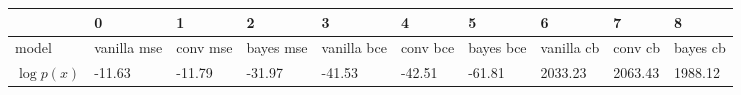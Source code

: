 \begin{tabular}{llllllllll}
\toprule
{} &            0 &         1 &          2 &            3 &         4 &          5 &           6 &        7 &         8 \\
\midrule
model       &  vanilla mse &  conv mse &  bayes mse &  vanilla bce &  conv bce &  bayes bce &  vanilla cb &  conv cb &  bayes cb \\
$\log p(x)$ &       -11.63 &    -11.79 &     -31.97 &       -41.53 &    -42.51 &     -61.81 &     2033.23 &  2063.43 &   1988.12 \\
\bottomrule
\end{tabular}
